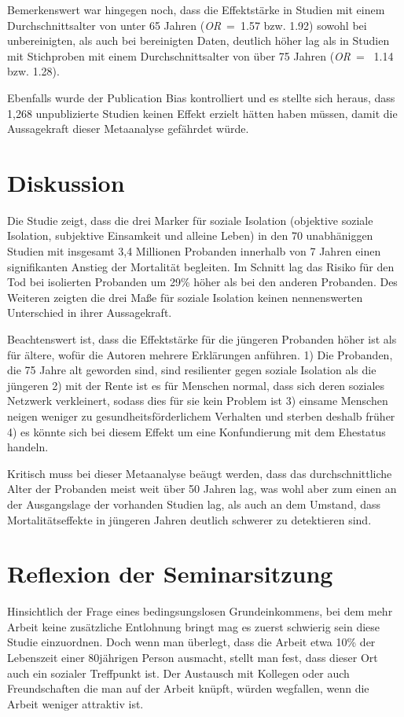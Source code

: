 \documentclass[doc]{apa6}
\begin{document}
        Bemerkenswert war hingegen noch, dass die Effektstärke in Studien mit einem Durchschnittsalter von unter 65 Jahren (\textit{OR}~=~1.57 bzw. 1.92)  sowohl bei unbereinigten, als auch bei bereinigten Daten, deutlich höher lag als in Studien mit Stichproben mit einem Durchschnittsalter von über 75 Jahren (\textit{OR}~=~ 1.14 bzw. 1.28).
        
        Ebenfalls wurde der Publication Bias kontrolliert und es stellte sich heraus, dass 1,268 unpublizierte Studien keinen Effekt erzielt hätten haben müssen, damit die Aussagekraft dieser Metaanalyse gefährdet würde.
        
    \section{Diskussion}
        Die Studie zeigt, dass die drei Marker für soziale Isolation (objektive soziale Isolation, subjektive Einsamkeit und alleine Leben) in den 70 unabhäniggen Studien mit insgesamt 3,4 Millionen Probanden innerhalb von 7 Jahren einen signifikanten Anstieg der Mortalität begleiten. Im Schnitt lag das Risiko für den Tod bei isolierten Probanden um 29\% höher als bei den anderen Probanden. Des Weiteren zeigten die drei Maße für soziale Isolation keinen nennenswerten Unterschied in ihrer Aussagekraft. 
        
        Beachtenswert ist, dass die Effektstärke für die jüngeren Probanden höher ist als für ältere, wofür die Autoren mehrere Erklärungen anführen. 1) Die Probanden, die 75 Jahre alt geworden sind, sind resilienter gegen soziale Isolation als die jüngeren 2) mit der Rente ist es für Menschen normal, dass sich deren soziales Netzwerk verkleinert, sodass dies für sie kein Problem ist 3) einsame Menschen neigen weniger zu gesundheitsförderlichem Verhalten und sterben deshalb früher 4) es könnte sich bei diesem Effekt um eine Konfundierung mit dem Ehestatus handeln.
        
        Kritisch muss bei dieser Metaanalyse beäugt werden, dass das durchschnittliche Alter der Probanden meist weit über 50 Jahren lag, was wohl aber zum einen an der Ausgangslage der vorhanden Studien lag, als auch an dem Umstand, dass Mortalitätseffekte in jüngeren Jahren deutlich schwerer zu detektieren sind.
        
    
    \section{Reflexion der Seminarsitzung}
        Hinsichtlich der Frage eines bedingsungslosen Grundeinkommens, bei dem mehr Arbeit keine zusätzliche Entlohnung bringt mag es zuerst schwierig sein diese Studie einzuordnen. Doch wenn man überlegt, dass die Arbeit etwa 10\% der Lebenszeit einer 80jährigen Person ausmacht, stellt man fest, dass dieser Ort auch ein sozialer Treffpunkt ist. Der Austausch mit Kollegen oder auch Freundschaften die man auf der Arbeit knüpft, würden wegfallen, wenn die Arbeit weniger attraktiv ist.
        
\end{document}
